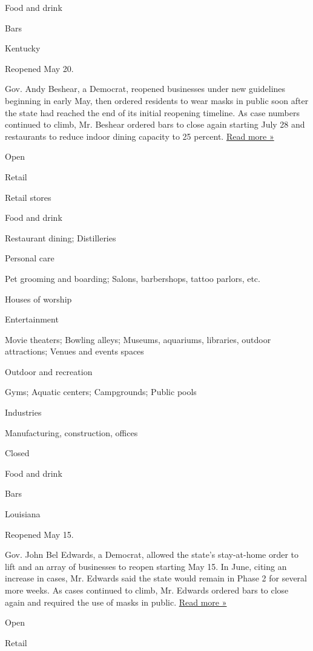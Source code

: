 Food and drink

Bars

Kentucky

Reopened May 20.

Gov. Andy Beshear, a Democrat, reopened businesses under new guidelines
beginning in early May, then ordered residents to wear masks in public
soon after the state had reached the end of its initial reopening
timeline. As case numbers continued to climb, Mr. Beshear ordered bars
to close again starting July 28 and restaurants to reduce indoor dining
capacity to 25 percent.
\href{https://www.courier-journal.com/story/news/2020/07/27/kentucky-gov-andy-beshear-order-bar-closures-covid-cases-spike/5517328002/}{Read
more »}

Open

Retail

Retail stores

Food and drink

Restaurant dining; Distilleries

Personal care

Pet grooming and boarding; Salons, barbershops, tattoo parlors, etc.

Houses of worship

Entertainment

Movie theaters; Bowling alleys; Museums, aquariums, libraries, outdoor
attractions; Venues and events spaces

Outdoor and recreation

Gyms; Aquatic centers; Campgrounds; Public pools

Industries

Manufacturing, construction, offices

Closed

Food and drink

Bars

Louisiana

Reopened May 15.

Gov. John Bel Edwards, a Democrat, allowed the state's stay-at-home
order to lift and an array of businesses to reopen starting May 15. In
June, citing an increase in cases, Mr. Edwards said the state would
remain in Phase 2 for several more weeks. As cases continued to climb,
Mr. Edwards ordered bars to close again and required the use of masks in
public.
\href{https://www.theadvocate.com/baton_rouge/news/coronavirus/article_06904936-d122-11ea-ba80-37555176f8af.html}{Read
more »}

Open

Retail

